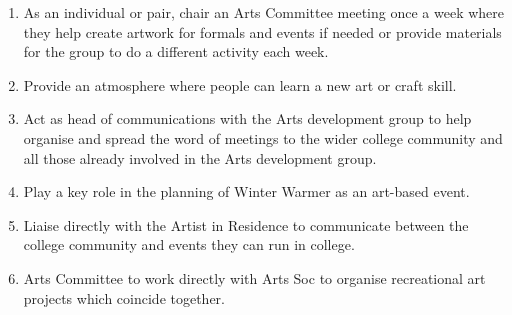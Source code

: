 \begin{enumerate}
    \item As an individual or pair, chair an Arts Committee meeting once a week where they help create artwork for formals and events if needed or provide materials for the group to do a different activity each week.
    \item Provide an atmosphere where people can learn a new art or craft skill.
    \item Act as head of communications with the Arts development group to help organise and spread the word of meetings to the wider college community and all those already involved in the Arts development group.
    \item Play a key role in the planning of Winter Warmer as an art-based event. 
    \item Liaise directly with the Artist in Residence to communicate between the college community and events they can run in college.
    \item Arts Committee to work directly with Arts Soc to organise recreational art projects which coincide together.
    
\end{enumerate}

